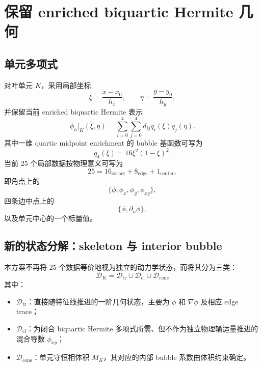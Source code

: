 \documentclass[11pt,a4paper]{ctexart}
\newcommand{\grad}{\nabla}
\begin{document}
\section{保留 enriched biquartic Hermite 几何}

\subsection{单元多项式}

对叶单元 $K$，采用局部坐标
\begin{equation}
    \xi=\frac{x-x_0}{h_x},\qquad
    \eta=\frac{y-y_0}{h_y},
\end{equation}
并保留当前 enriched biquartic Hermite 表示
\begin{equation}
    \phi_h|_K(\xi,\eta)
    =\sum_{i=0}^{4}\sum_{j=0}^{4}d_{ij}q_i(\xi)q_j(\eta).
    \label{eq:q4}
\end{equation}
其中一维 quartic midpoint enrichment 的 bubble 基函数可写为
\begin{equation}
    q_4(\xi)=16\xi^2(1-\xi)^2.
\end{equation}
当前 25 个局部数据按物理意义可写为
\begin{equation}
    25=16_{\mathrm{corner}}+8_{\mathrm{edge}}+1_{\mathrm{center}},
\end{equation}
即角点上的
\begin{equation}
    \{\phi,\phi_x,\phi_y,\phi_{xy}\},
\end{equation}
四条边中点上的
\begin{equation}
    \{\phi,\partial_n\phi\},
\end{equation}
以及单元中心的一个标量值。

\subsection{新的状态分解：skeleton 与 interior bubble}

本方案不再将 25 个数据等价地视为独立的动力学状态，而将其分为三类：
\begin{equation}
    \boxed{
    \mathcal D_K=
    \mathcal D_{\mathrm{tr}}
    \cup
    \mathcal D_{\mathrm{cl}}
    \cup
    \mathcal D_{\mathrm{cons}}
    }
\end{equation}
其中：
\begin{itemize}
    \item $\mathcal D_{\mathrm{tr}}$：直接随特征线推进的一阶几何状态，主要为 $\phi$ 和 $\grad\phi$ 及相应 edge trace；
    \item $\mathcal D_{\mathrm{cl}}$：为闭合 biquartic Hermite 多项式所需、但不作为独立物理输运量推进的混合导数 $\phi_{xy}$；
    \item $\mathcal D_{\mathrm{cons}}$：单元守恒相体积 $M_K$，其对应的内部 bubble 系数由体积约束确定。
\end{itemize}
\end{document}
